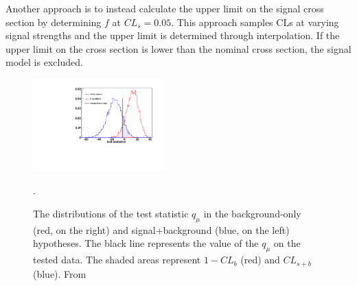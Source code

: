 Another approach is to instead calculate the upper limit on the signal 
cross section by determining $f$ at $CL_{s} = 0.05$.  This approach samples 
CLs at varying signal strengths and the upper limit is 
determined through interpolation. If the upper limit on the cross section 
is lower than the nominal cross section, the signal model is excluded.

\begin{figure}[h!t]
  \begin{center}
      \includegraphics[width=0.45\textwidth,]{figures/hybrid_plot}
      \caption{\label{fig:hybrid_plot} The distributions of the test statistic $q_{\mu}$
        in the background-only (red, on the right) and signal+background (blue, on the left) hypotheses. 
        The black line represents the value of the $q_{\mu}$ on the tested data. The shaded areas represent 
        $1-CL_{b}$ (red) and $CL_{s+b}$ (blue).  From~\cite{Moneta:1289965}}.
    \label{fig:hybrid_plot}
  \end{center}
\end{figure}


